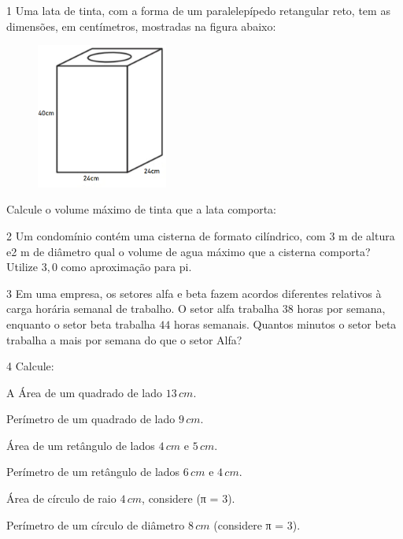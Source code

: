 {

\num{1}  Uma lata de tinta, com a forma de um paralelepípedo retangular reto,
tem as dimensões, em centímetros, mostradas na figura abaixo:

\begin{figure}
\includegraphics[width=1.69792in,height=1.88115in]{./imgSAEB_6_MAT/media/image95.png}
\end{figure}

Calcule o volume máximo de tinta que a lata comporta:


\num{2}  Um condomínio contém uma cisterna de formato cilíndrico, com $3$ m de
altura e2 m de diâmetro qual o volume de agua máximo que a cisterna
comporta? Utilize $3,0$ como aproximação para pi.


\num{3}  Em uma empresa, os setores alfa e beta fazem acordos diferentes
relativos à carga horária semanal de trabalho. O setor alfa trabalha $38$
horas por semana, enquanto o setor beta trabalha $44$ horas semanais.
Quantos minutos o setor beta trabalha a mais por semana do que o setor
Alfa? 


\num{4} Calcule:

\begin{escolha}
\item A Área de um quadrado de lado $13\,cm$. 
\item Perímetro de um quadrado de lado $9\,cm$. 
\item Área de um retângulo de lados $4\,cm$ e $5\,cm$. 
\item Perímetro de um retângulo de lados $6\,cm$ e $4\,cm$. 
\item Área de círculo de raio $4\,cm$, considere (π = $3$). 
\item Perímetro de um círculo de diâmetro $8\,cm$ (considere π = $3$). 
\end{escolha}

}
